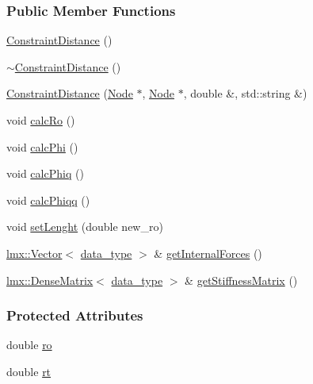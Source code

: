 \subsubsection*{Public Member Functions}
\begin{DoxyCompactItemize}
\item 
\hyperlink{classmknix_1_1_constraint_distance_ad89b1d56b296625e72fe0bcf4cea3c5c}{Constraint\+Distance} ()
\item 
\hyperlink{classmknix_1_1_constraint_distance_aa39735f682295e2c7b839fddb9eba545}{$\sim$\+Constraint\+Distance} ()
\item 
\hyperlink{classmknix_1_1_constraint_distance_adc9113e52374f275b1b79bfdca72b971}{Constraint\+Distance} (\hyperlink{classmknix_1_1_node}{Node} $\ast$, \hyperlink{classmknix_1_1_node}{Node} $\ast$, double \&, std\+::string \&)
\item 
void \hyperlink{classmknix_1_1_constraint_distance_a32df0e5f0198ce5c7871e2b6a5cafb7c}{calc\+Ro} ()
\item 
void \hyperlink{classmknix_1_1_constraint_distance_ad838af34d5ada5ba2f4ce559a472e16a}{calc\+Phi} ()
\item 
void \hyperlink{classmknix_1_1_constraint_distance_a6fa6c37266c01a1e8f577418dd886037}{calc\+Phiq} ()
\item 
void \hyperlink{classmknix_1_1_constraint_distance_ad4d1eb206239508f7f2f5b4d26b957eb}{calc\+Phiqq} ()
\item 
void \hyperlink{classmknix_1_1_constraint_distance_aadda81ffe998ebc5d03adc91f73a016e}{set\+Lenght} (double new\+\_\+ro)
\item 
\hyperlink{classlmx_1_1_vector}{lmx\+::\+Vector}$<$ \hyperlink{namespacemknix_a16be4b246fbf2cceb141e3a179111020}{data\+\_\+type} $>$ \& \hyperlink{classmknix_1_1_constraint_distance_aae757ba28e181259a196fbc0a1e8bfaf}{get\+Internal\+Forces} ()
\item 
\hyperlink{classlmx_1_1_dense_matrix}{lmx\+::\+Dense\+Matrix}$<$ \hyperlink{namespacemknix_a16be4b246fbf2cceb141e3a179111020}{data\+\_\+type} $>$ \& \hyperlink{classmknix_1_1_constraint_distance_a847365545dcef34ee44bbadd20d819bf}{get\+Stiffness\+Matrix} ()
\end{DoxyCompactItemize}
\subsubsection*{Protected Attributes}
\begin{DoxyCompactItemize}
\item 
double \hyperlink{classmknix_1_1_constraint_distance_a2d4a4e3c3b75b23f63a772b71c4badaa}{ro}
\item 
double \hyperlink{classmknix_1_1_constraint_distance_ae4054619a2e3205079c4911ad69db4eb}{rt}
\end{DoxyCompactItemize}


